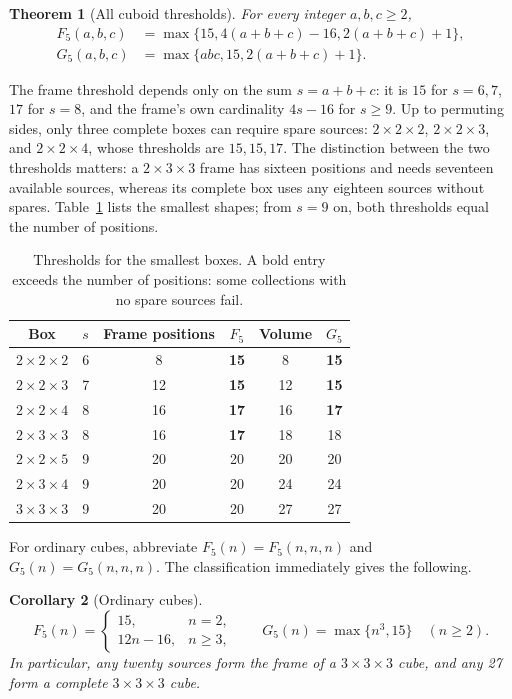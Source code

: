 \documentclass[11pt]{article}
\newtheorem{theorem}{Theorem}
\newtheorem{corollary}[theorem]{Corollary}
\theoremstyle{remark}
\begin{document}
\begin{theorem}[All cuboid thresholds]\label{thm:all-boxes}
For every integer $a,b,c\ge2$,
\[
 \begin{aligned}
 F_5(a,b,c)&=\max\{15,4(a+b+c)-16,2(a+b+c)+1\},\\
 G_5(a,b,c)&=\max\{abc,15,2(a+b+c)+1\}.
 \end{aligned}
\]
\end{theorem}
The frame threshold depends only on the sum $s=a+b+c$: it is $15$ for
$s=6,7$, $17$ for $s=8$, and the frame's own cardinality $4s-16$ for
$s\ge9$. Up to permuting sides, only three complete boxes can require
spare sources: $2\times2\times2$, $2\times2\times3$, and
$2\times2\times4$, whose thresholds are $15,15,17$.
The distinction between the two thresholds matters: a $2\times3\times3$
frame has sixteen positions and needs seventeen available sources,
whereas its complete box uses any eighteen sources without spares.
Table~\ref{tab:small-boxes} lists the smallest shapes; from $s=9$ on, both
thresholds equal the number of positions.
\begin{table}[ht]
\centering
\small
\begin{tabular}{c c c c c c}
\toprule
Box & $s$ & Frame positions & $F_5$ & Volume & $G_5$\\
\midrule
$2\times2\times2$ & 6 & 8 & \textbf{15} & 8 & \textbf{15}\\
$2\times2\times3$ & 7 & 12 & \textbf{15} & 12 & \textbf{15}\\
$2\times2\times4$ & 8 & 16 & \textbf{17} & 16 & \textbf{17}\\
$2\times3\times3$ & 8 & 16 & \textbf{17} & 18 & 18\\
$2\times2\times5$ & 9 & 20 & 20 & 20 & 20\\
$2\times3\times4$ & 9 & 20 & 20 & 24 & 24\\
$3\times3\times3$ & 9 & 20 & 20 & 27 & 27\\
\bottomrule
\end{tabular}
\caption{Thresholds for the smallest boxes. A bold entry exceeds the number
of positions: some collections with no spare sources fail.}
\label{tab:small-boxes}
\end{table}

For ordinary cubes, abbreviate $F_5(n)=F_5(n,n,n)$ and
$G_5(n)=G_5(n,n,n)$. The classification immediately gives the following.
\begin{corollary}[Ordinary cubes]\label{thm:frames}\label{thm:complete}
\[
 F_5(n)=\begin{cases}15,&n=2,\\12n-16,&n\ge3,\end{cases}
 \qquad G_5(n)=\max\{n^3,15\}\quad(n\ge2).
\]
In particular, any twenty sources form the frame of a $3\times3\times3$ cube, and any 27 form a
complete $3\times3\times3$ cube.
\end{corollary}
\end{document}
